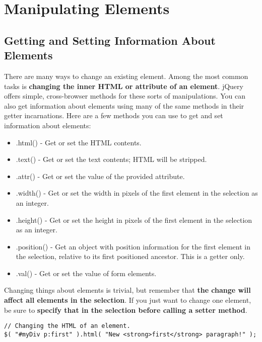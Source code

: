 \documentclass[10pt,letterpaper]{report}
\begin{document}
\section{Manipulating Elements}
\subsection{Getting and Setting Information About Elements}

There are many ways to change an existing element. Among the most common tasks is \textbf{changing the inner HTML or attribute of an element}. jQuery offers simple, cross-browser methods for these sorts of manipulations. You can also get information about elements using many of the same methods in their getter incarnations. Here are a few methods you can use to get and set information about elements:
\begin{itemize}
\item .html() - Get or set the HTML contents.
\item .text() - Get or set the text contents; HTML will be stripped.
\item .attr() - Get or set the value of the provided attribute.
\item .width() - Get or set the width in pixels of the first element in the selection as an integer.
\item .height() - Get or set the height in pixels of the first element in the selection as an integer.
\item .position() - Get an object with position information for the first element in the selection, relative to its first positioned ancestor. This is a getter only.
\item .val() - Get or set the value of form elements.
\end{itemize}
  
Changing things about elements is trivial, but remember that \textbf{the change will affect all elements in the selection}. If you just want to change one element, be sure to \textbf{specify that in the selection before calling a setter method}.
\begin{lstlisting}
// Changing the HTML of an element.
$( "#myDiv p:first" ).html( "New <strong>first</strong> paragraph!" );
\end{lstlisting}
\end{document}
